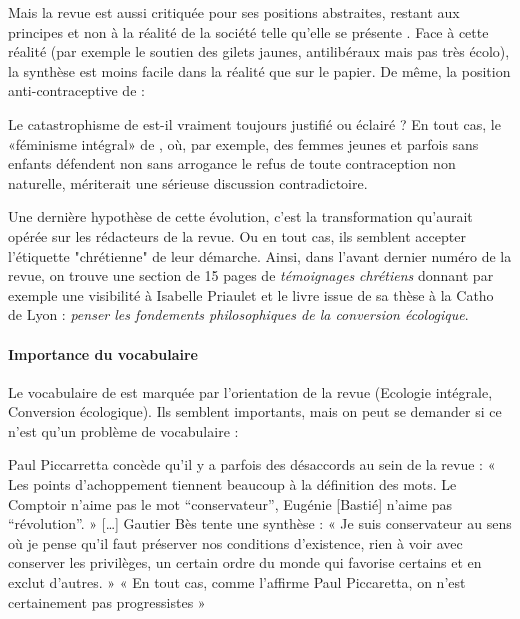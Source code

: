 Mais la revue est aussi critiquée pour ses positions abstraites, restant aux principes et non à la réalité de la société telle qu'elle se présente \cite{flipo_limite_2019}. Face à cette réalité  (par exemple le soutien des gilets jaunes, antilibéraux mais pas très écolo), la synthèse est moins facile dans la réalité que sur le papier. De même, la position anti-contraceptive de \RLimite : 

 \begin{singlequote}
 Le catastrophisme de \RLimite est-il vraiment toujours justifié ou éclairé ? En tout cas, le «féminisme intégral» de \RLimite, où, par exemple, des femmes jeunes et parfois sans enfants défendent non sans arrogance le refus de toute contraception non naturelle, mériterait une sérieuse discussion contradictoire.  \cite{Schlegel_2018_Limite}
\end{singlequote}

Une dernière hypothèse de cette évolution, c'est la transformation qu'aurait opérée \LS sur les rédacteurs de la revue. Ou en tout cas,  ils semblent accepter l'étiquette "chrétienne" de leur démarche. Ainsi, dans l'avant dernier numéro de la revue, on trouve une section de 15 pages de \textit{témoignages chrétiens} donnant par exemple une visibilité à Isabelle Priaulet et le livre issue de sa thèse à la Catho de Lyon : \textit{penser les fondements philosophiques de la conversion écologique}.


 

\paragraph{Importance du vocabulaire} Le vocabulaire de \RLimite est marquée par l'orientation de la revue (Ecologie intégrale, Conversion écologique). Ils semblent importants, mais on peut se demander si ce n'est qu'un problème de vocabulaire : 

\begin{singlequote}
 Paul Piccarretta concède qu’il y a parfois des désaccords au sein de la revue : « Les points d’achoppement tiennent beaucoup à la définition des mots. Le Comptoir n’aime pas le mot “conservateur”, Eugénie [Bastié] n’aime pas “révolution”. »  [\ldots] Gautier Bès tente une synthèse : « Je suis conservateur au sens où je pense qu’il faut préserver nos conditions d’existence, rien à voir avec conserver les privilèges, un certain ordre du monde qui favorise certains et en exclut d’autres. » « En tout cas, comme l’affirme Paul Piccaretta, on n’est certainement pas progressistes » 
    \cite{carle_contre-revolutions_2017}
\end{singlequote}




